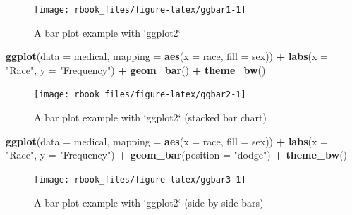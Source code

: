 \documentclass[]{book}
\newenvironment{Shaded}{\begin{snugshade}}{\end{snugshade}}
\newcommand{\DataTypeTok}[1]{\textcolor[rgb]{0.13,0.29,0.53}{#1}}
\newcommand{\KeywordTok}[1]{\textcolor[rgb]{0.13,0.29,0.53}{\textbf{#1}}}
\newcommand{\NormalTok}[1]{#1}
\newcommand{\OperatorTok}[1]{\textcolor[rgb]{0.81,0.36,0.00}{\textbf{#1}}}
\newcommand{\StringTok}[1]{\textcolor[rgb]{0.31,0.60,0.02}{#1}}
\begin{document}
\begin{figure}

{\centering \texttt{[image: rbook\_files/figure-latex/ggbar1-1]} 

}

\caption{A bar plot example with `ggplot2`}\label{fig:ggbar1}
\end{figure}

\begin{Shaded}
\begin{Highlighting}[]
\KeywordTok{ggplot}\NormalTok{(}\DataTypeTok{data =}\NormalTok{ medical, }
       \DataTypeTok{mapping =} \KeywordTok{aes}\NormalTok{(}\DataTypeTok{x =}\NormalTok{ race, }\DataTypeTok{fill =}\NormalTok{ sex)) }\OperatorTok{+}\StringTok{ }
\StringTok{  }\KeywordTok{labs}\NormalTok{(}\DataTypeTok{x =} \StringTok{"Race"}\NormalTok{,}
       \DataTypeTok{y =} \StringTok{"Frequency"}\NormalTok{) }\OperatorTok{+}\StringTok{ }
\StringTok{  }\KeywordTok{geom_bar}\NormalTok{() }\OperatorTok{+}
\StringTok{  }\KeywordTok{theme_bw}\NormalTok{()}
\end{Highlighting}
\end{Shaded}

\begin{figure}

{\centering \texttt{[image: rbook\_files/figure-latex/ggbar2-1]} 

}

\caption{A bar plot example with `ggplot2` (stacked bar chart)}\label{fig:ggbar2}
\end{figure}

\begin{Shaded}
\begin{Highlighting}[]
\KeywordTok{ggplot}\NormalTok{(}\DataTypeTok{data =}\NormalTok{ medical, }
       \DataTypeTok{mapping =} \KeywordTok{aes}\NormalTok{(}\DataTypeTok{x =}\NormalTok{ race, }\DataTypeTok{fill =}\NormalTok{ sex)) }\OperatorTok{+}\StringTok{ }
\StringTok{  }\KeywordTok{labs}\NormalTok{(}\DataTypeTok{x =} \StringTok{"Race"}\NormalTok{,}
       \DataTypeTok{y =} \StringTok{"Frequency"}\NormalTok{) }\OperatorTok{+}\StringTok{ }
\StringTok{  }\KeywordTok{geom_bar}\NormalTok{(}\DataTypeTok{position =} \StringTok{"dodge"}\NormalTok{) }\OperatorTok{+}
\StringTok{  }\KeywordTok{theme_bw}\NormalTok{()}
\end{Highlighting}
\end{Shaded}

\begin{figure}

{\centering \texttt{[image: rbook\_files/figure-latex/ggbar3-1]} 

}

\caption{A bar plot example with `ggplot2` (side-by-side bars)}\label{fig:ggbar3}
\end{figure}
\end{document}
